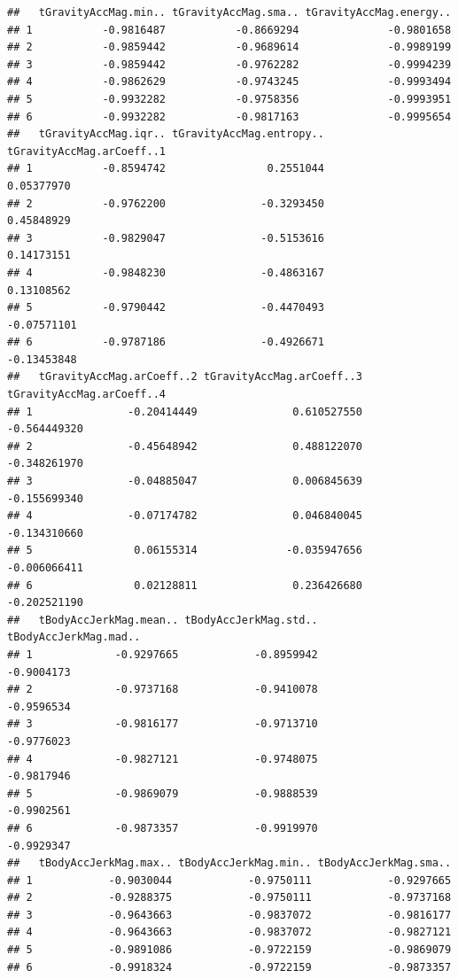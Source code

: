\documentclass[
]{article}
\begin{document}
\begin{verbatim}
##   tGravityAccMag.min.. tGravityAccMag.sma.. tGravityAccMag.energy..
## 1           -0.9816487           -0.8669294              -0.9801658
## 2           -0.9859442           -0.9689614              -0.9989199
## 3           -0.9859442           -0.9762282              -0.9994239
## 4           -0.9862629           -0.9743245              -0.9993494
## 5           -0.9932282           -0.9758356              -0.9993951
## 6           -0.9932282           -0.9817163              -0.9995654
##   tGravityAccMag.iqr.. tGravityAccMag.entropy.. tGravityAccMag.arCoeff..1
## 1           -0.8594742                0.2551044                0.05377970
## 2           -0.9762200               -0.3293450                0.45848929
## 3           -0.9829047               -0.5153616                0.14173151
## 4           -0.9848230               -0.4863167                0.13108562
## 5           -0.9790442               -0.4470493               -0.07571101
## 6           -0.9787186               -0.4926671               -0.13453848
##   tGravityAccMag.arCoeff..2 tGravityAccMag.arCoeff..3 tGravityAccMag.arCoeff..4
## 1               -0.20414449               0.610527550              -0.564449320
## 2               -0.45648942               0.488122070              -0.348261970
## 3               -0.04885047               0.006845639              -0.155699340
## 4               -0.07174782               0.046840045              -0.134310660
## 5                0.06155314              -0.035947656              -0.006066411
## 6                0.02128811               0.236426680              -0.202521190
##   tBodyAccJerkMag.mean.. tBodyAccJerkMag.std.. tBodyAccJerkMag.mad..
## 1             -0.9297665            -0.8959942            -0.9004173
## 2             -0.9737168            -0.9410078            -0.9596534
## 3             -0.9816177            -0.9713710            -0.9776023
## 4             -0.9827121            -0.9748075            -0.9817946
## 5             -0.9869079            -0.9888539            -0.9902561
## 6             -0.9873357            -0.9919970            -0.9929347
##   tBodyAccJerkMag.max.. tBodyAccJerkMag.min.. tBodyAccJerkMag.sma..
## 1            -0.9030044            -0.9750111            -0.9297665
## 2            -0.9288375            -0.9750111            -0.9737168
## 3            -0.9643663            -0.9837072            -0.9816177
## 4            -0.9643663            -0.9837072            -0.9827121
## 5            -0.9891086            -0.9722159            -0.9869079
## 6            -0.9918324            -0.9722159            -0.9873357

\end{verbatim}
\end{document}
